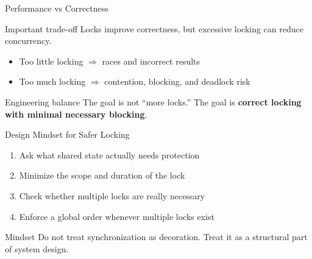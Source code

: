\documentclass[aspectratio=169,11pt]{beamer}
\begin{document}
	\begin{frame}{Performance vs Correctness}
		\begin{block}{Important trade-off}
			Locks improve correctness, but excessive locking can reduce concurrency.
		\end{block}
		
		\bigskip
		
		\begin{itemize}
			\item Too little locking \(\Rightarrow\) races and incorrect results
			\item Too much locking \(\Rightarrow\) contention, blocking, and deadlock risk
		\end{itemize}
		
		\bigskip
		
		\begin{alertblock}{Engineering balance}
			The goal is not “more locks.”  
			The goal is \textbf{correct locking with minimal necessary blocking}.
		\end{alertblock}
	\end{frame}
	
	\begin{frame}{Design Mindset for Safer Locking}
		\begin{enumerate}
			\item Ask what shared state actually needs protection
			\item Minimize the scope and duration of the lock
			\item Check whether multiple locks are really necessary
			\item Enforce a global order whenever multiple locks exist
		\end{enumerate}
		
		\bigskip
		
		\begin{block}{Mindset}
			Do not treat synchronization as decoration.  
			Treat it as a structural part of system design.
		\end{block}
	\end{frame}
	
	
\end{document}
